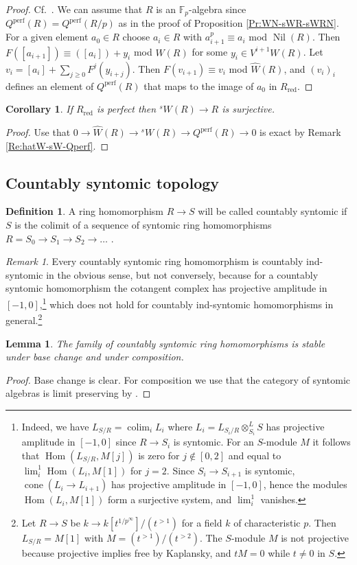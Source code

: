 \documentclass[a4paper,11pt]{amsart}
\theoremstyle{plain}
\newtheorem{Lemma}[equation]{Lemma}
\newtheorem{Cor}[equation]{Corollary}
\theoremstyle{definition}
\newtheorem{Defn}[equation]{Definition}
\theoremstyle{remark}
\newtheorem{Remark}[equation]{Remark}
\newcommand{\bLe}{\begin{Lemma}}
\newcommand{\eLe}{\end{Lemma}}
\newcommand{\bCo}{\begin{Cor}}
\newcommand{\eCo}{\end{Cor}}
\newcommand{\bDe}{\begin{Defn}}
\newcommand{\eDe}{\end{Defn}}
\newcommand{\bRe}{\begin{Remark}}
\newcommand{\eRe}{\end{Remark}}
\newcommand{\bproof}{\begin{proof}}
\newcommand{\eproof}{\end{proof}}
\numberwithin{equation}{section}
\newcommand{\FF}{{\mathbb{F}}}
\DeclareMathOperator{\colim}{colim}
\DeclareMathOperator{\cone}{cone}
\DeclareMathOperator{\perf}{perf}
\DeclareMathOperator{\red}{red}
\DeclareMathOperator{\Hom}{Hom}
\DeclareMathOperator{\Nil}{Nil}
\newcommand{\limperf}{^{\perf}}
\newcommand{\sW}{{}^sW}
\begin{document}
\bproof
Cf.\ \cite[Proposition 3.42]{BMVZ}.
We can assume that $R$ is an $\FF_p$-algebra since $Q\limperf(R)=Q\limperf(R/p)$ as in the proof of Proposition \ref{Pr:WN-sWR-sWRN}. For a given element $a_0\in R$ choose $a_i\in R$ with $a_{i+1}^{p}\equiv a_i$ mod $\Nil(R)$. Then $F([a_{i+1}])\equiv([a_i])+ y_i$ mod $\hat W(R)$ for some $y_i\in V^{i+1} W(R)$. Let $v_i=[a_i]+\sum_{j\ge 0}F^j(y_{i+j})$. Then $F(v_{i+1})\equiv v_i$ mod $\hat W(R)$, and $(v_i)_i$ defines an element of $Q\limperf(R)$ that maps to the image of $a_0$ in $R_{\red}$.
\eproof

\bCo
\label{Co:sWR-R-surj}
If $R_{\red}$ is perfect then $\sW(R)\to R$ is surjective.
\eCo

\bproof
Use that $0\to\hat W(R)\to\sW(R)\to Q\limperf(R)\to 0$ is exact by Remark \ref{Re:hatW-sW-Qperf}.
\eproof

\subsection{Countably syntomic topology} 

\bDe
A ring homomorphism $R\to S$ will be called countably syntomic if $S$ is the colimit of a sequence of  syntomic ring homomorphisms $R=S_0\to S_1\to S_2\to\ldots$ .
\eDe

\bRe
Every countably syntomic ring homomorphism is countably ind-syntomic in the obvious sense, but not conversely, because for a countably syntomic homomorphism the cotangent complex has projective amplitude in $[-1,0]$,\footnote{Indeed, we have $L_{S/R}=\colim_i L_i$ where $L_i=L_{S_i/R}\otimes^L_{S_i}S$ has projective amplitude in $[-1,0]$ since $R\to S_i$ is syntomic. For an $S$-module $M$ it follows that $\Hom(L_{S/R},M[j])$ is zero for $j\not\in[0,2]$ and equal to $\lim^1_i\Hom(L_i,M[1])$ for $j=2$. Since $S_i\to S_{i+1}$ is syntomic, $\cone(L_i\to L_{i+1})$ has projective amplitude in $[-1,0]$, hence the modules $\Hom(L_i,M[1])$ form a surjective system, and $\lim^1_i$ vanishes.}
which does not hold for countably ind-syntomic homomorphisms in general.\footnote{Let $R\to S$ be $k\to k[t^{1/p^\infty}]/(t^{>1})$ for a field $k$ of characteristic $p$. Then $L_{S/R}=M[1]$ with $M=(t^{>1})/(t^{>2})$. The $S$-module $M$ is not projective because projective implies free by Kaplansky, and $tM=0$ while $t\ne 0$ in $S$.}
\eRe

\bLe
\label{Le:N-syntomic-compos}
The family of countably syntomic ring homomorphisms is stable under base change and under composition.
\eLe

\bproof
Base change is clear. For composition we use that the category of syntomic algebras is limit preserving by \cite[
\href{https://stacks.math.columbia.edu/tag/05N9}{Lemma 05N9}, \href{https://stacks.math.columbia.edu/tag/0C33}{Lemma 0C33}]{Stacks}. 
\eproof
\end{document}
